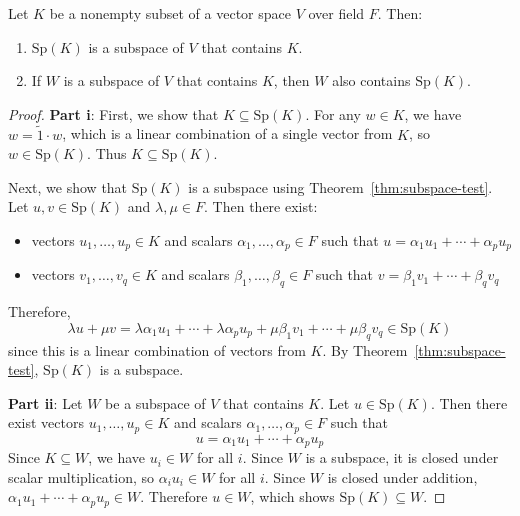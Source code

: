 \begin{theorem}\label{thm:span-properties}
    Let $K$ be a nonempty subset of a vector space $V$ over field $F$. Then:
    \begin{enumerate}[label=\roman*.]
        \item $\mathrm{Sp}(K)$ is a subspace of $V$ that contains $K$.
        \item If $W$ is a subspace of $V$ that contains $K$, then $W$ also contains $\mathrm{Sp}(K)$.
    \end{enumerate}
\end{theorem}

\begin{proof}
    \textbf{Part i}: First, we show that $K \subseteq \mathrm{Sp}(K)$. For any $w \in K$, we have $w = \tilde{1} \cdot w$, which is a linear combination of a single vector from $K$, so $w \in \mathrm{Sp}(K)$. Thus $K \subseteq \mathrm{Sp}(K)$.
    
    Next, we show that $\mathrm{Sp}(K)$ is a subspace using Theorem~\ref{thm:subspace-test}. Let $u, v \in \mathrm{Sp}(K)$ and $\lambda, \mu \in F$. Then there exist:
    \begin{itemize}
        \item vectors $u_1, \ldots, u_p \in K$ and scalars $\alpha_1, \ldots, \alpha_p \in F$ such that $u = \alpha_1 u_1 + \cdots + \alpha_p u_p$
        \item vectors $v_1, \ldots, v_q \in K$ and scalars $\beta_1, \ldots, \beta_q \in F$ such that $v = \beta_1 v_1 + \cdots + \beta_q v_q$
    \end{itemize}
    Therefore,
    \[
    \lambda u + \mu v = \lambda\alpha_1 u_1 + \cdots + \lambda\alpha_p u_p + \mu\beta_1 v_1 + \cdots + \mu\beta_q v_q \in \mathrm{Sp}(K)
    \]
    since this is a linear combination of vectors from $K$. By Theorem~\ref{thm:subspace-test}, $\mathrm{Sp}(K)$ is a subspace.
    
    \textbf{Part ii}: Let $W$ be a subspace of $V$ that contains $K$. Let $u \in \mathrm{Sp}(K)$. Then there exist vectors $u_1, \ldots, u_p \in K$ and scalars $\alpha_1, \ldots, \alpha_p \in F$ such that
    \[
    u = \alpha_1 u_1 + \cdots + \alpha_p u_p
    \]
    Since $K \subseteq W$, we have $u_i \in W$ for all $i$. Since $W$ is a subspace, it is closed under scalar multiplication, so $\alpha_i u_i \in W$ for all $i$. Since $W$ is closed under addition, $\alpha_1 u_1 + \cdots + \alpha_p u_p \in W$. Therefore $u \in W$, which shows $\mathrm{Sp}(K) \subseteq W$.
\end{proof}

